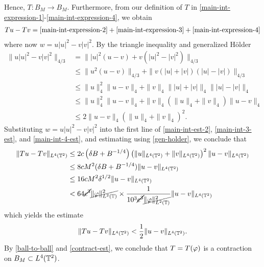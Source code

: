 %
%
Hence, $T: B_M \to B_M$. Furthermore, from our definition of $T$ in 
\eqref{main-int-expression-1}-\eqref{main-int-expression-4}, we obtain
%
%
\begin{equation*}
	\begin{split}
		Tu - Tv = \eqref{main-int-expression-2} + 
		\eqref{main-int-expression-3} + \eqref{main-int-expression-4}
	\end{split}
\end{equation*}
%
%
where now $w = u|u|^2 - v|v|^2$. By the triangle inequality and generalized
H\"{o}lder
%
%
\begin{equation}
	\label{gen-holder}
	\begin{split}
		\|u |u|^2 - v |v|^2\|_{4/3}
		& = \| |u|^2\left( u -v \right) + v\left( |u|^2 - |v|^2 
		\right)\|_{4/3}
		\\
		& \le \|u^2\left( u -v \right)\|_{4/3} + \|v\left( |u| + |v| 
		\right)\left( |u| - |v| \right) \|_{4/3}
		\\
		& \le \|u\|_4^2 \|u -v \|_4 + \|v\|_4  \| |u| + |v| \|_4 
		\| |u| - |v |\|_4 
		\\
		& \le \|u \|_4^2 \|u -v\|_4 + \|v\|_4\left( \|u\|_4 + \|v\|_4 
		\right) \|u -v \|_4
		\\
		& \le 2 \|u -v \|_4 \left(  \|u\|_4 + \|v\|_4 \right)^2.
	\end{split}
\end{equation}
%
%
Substituting $w = u|u|^2 - v|v|^2$ into the first line of \eqref{main-int-est-2}, 
\eqref{main-int-3-est}, and \eqref{main-int-4-est}, and estimating using  
\eqref{gen-holder}, we conclude that
%
%
\begin{equation*}
	\begin{split}
		\|Tu - Tv\|_{L^4(\mathbb{T}^2)}
		& \le 2c\left( \delta B + B^{-1/4} 
		\right)\left( \|u\|_{L^4(\mathbb{T}^2)} +
		\|v\|_{L^4(\mathbb{T}^2)}\right)^2 \|u -v \|_{L^4(\mathbb{T}^2)}
		\\
		& \le 8 c M^2(\delta B + B^{-1/4}) \|u - v\|_{L^4(\mathbb{T}^2)}
		\\
		& \le 16cM^2 \delta^{1/2} \|u-v\|_{L^4(\mathbb{T}^2)}
		\\
		& < 64 \cancel{c^3} \cancel{\|\varphi\|_{L^2(\mathbb{T})}^2}
		\times \frac{1}{10^3 \cancel{c^3} \cancel{\|\varphi\|_{L^2(\mathbb{T})}^2}}
		\|u-v\|_{L^4(\mathbb{T}^2)}
	\end{split}
\end{equation*}
%
%
which yields the estimate
%
%
\begin{equation}
	\label{contract-est}
	\begin{split}
		\|Tu - Tv\|_{L^4(\mathbb{T}^2)} < \frac{1}{2} \|u -v \|_{L^4(\mathbb{T}^2)}.
	\end{split}
\end{equation}
%
%
By \eqref{ball-to-ball} and \eqref{contract-est}, we conclude that
$T = T(\varphi)$ is a contraction on $B_M \subset L^4(\mathbb{T}^2)$. 
%
%
%
%
